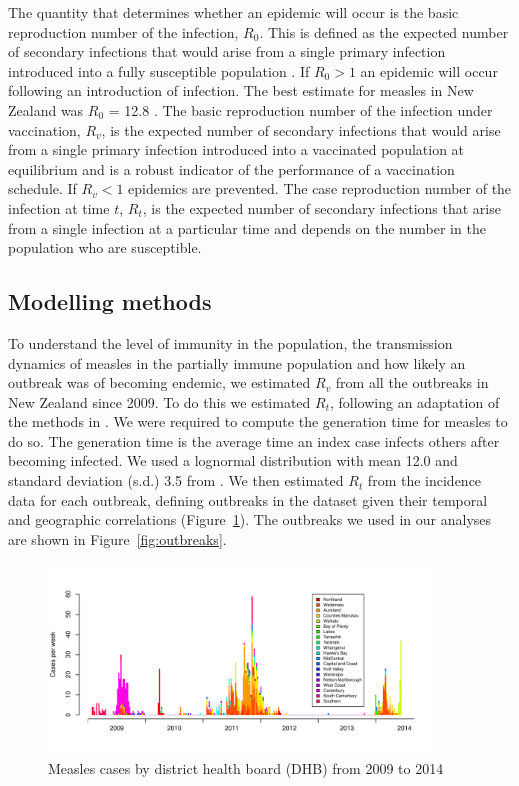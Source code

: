 \documentclass{article}
\begin{document}
The quantity that determines whether an epidemic will occur is the basic reproduction number of the infection, $R_0$. This is defined as the expected number of secondary infections that would arise from a single primary infection introduced into a fully susceptible population \citep{anderson91, diekmann0}. If $R_0 > 1$ an epidemic will occur following an introduction of infection. The best estimate for measles in New Zealand was $R_0$ = 12.8 \citep{roberts4}. The basic reproduction number of the infection under vaccination, $R_v$, is the expected number of secondary infections that would arise from a single primary infection introduced into a vaccinated population at equilibrium and is a robust indicator of the performance of a vaccination schedule. If $R_v < 1$ epidemics are prevented. The case reproduction number of the infection at time $t$, $R_t$, is the expected number of secondary infections that arise from a single infection at a particular time and depends on the number in the population who are susceptible.

\subsection{Modelling methods}

To understand the level of immunity in the population, the transmission dynamics of measles in the partially immune population and how likely an outbreak was of becoming endemic, we estimated $R_v$ from all the outbreaks in New Zealand since 2009. To do this we estimated $R_t$, following an adaptation of the methods in \citep{obidia12,wallinga4}. We were required to compute the generation time for measles to do so. The generation time is the average time an index case infects others after becoming infected. We used a lognormal distribution with mean 12.0 and standard deviation (s.d.) 3.5 from \citep{klinkenberg11}. We then estimated $R_t$ from the incidence data for each outbreak, defining outbreaks in the dataset given their temporal and geographic correlations (Figure~\ref{fig:dhbcases}). The outbreaks we used in our analyses are shown in Figure~\ref{fig:outbreaks}.


\begin{figure}
     \centering
     \includegraphics[width=0.9\textwidth]{cases_by_dhb_2009_2014.pdf}
     \caption{Measles cases by district health board (DHB) from 2009 to 2014}
     \label{fig:dhbcases}
\end{figure}
\end{document}
